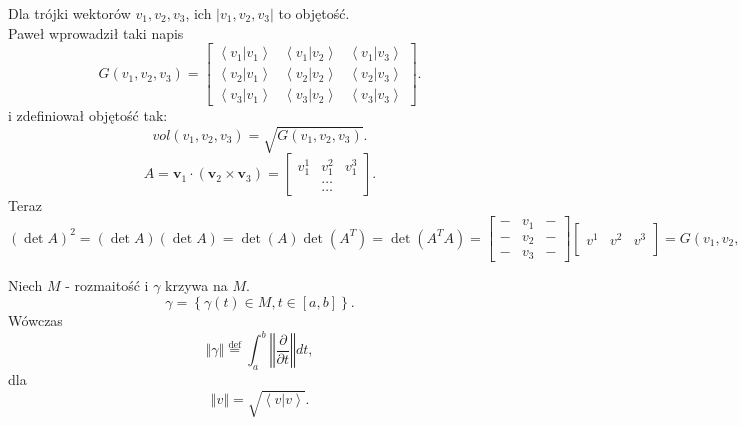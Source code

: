 \documentclass[../main.tex]{subfiles}
\begin{document}
    Dla trójki wektorów $v_1, v_2, v_3$, ich $\left| v_1, v_2, v_3 \right| $ to objętość.\\
    Paweł wprowadził taki napis
    \[
        G(v_1,v_2,v_3) = \begin{bmatrix} \left<v_1|v_1 \right>&\left<v_1|v_2 \right>&\left<v_1|v_3 \right>\\ \left<v_2|v_1 \right>&\left<v_2|v_2 \right>&\left<v_2|v_3 \right>\\ \left<v_3|v_1 \right>&\left<v_3|v_2 \right>&\left<v_3|v_3 \right> \end{bmatrix}
    .\]
i zdefiniował objętość tak:
 \[
     vol(v_1,v_2,v_3) = \sqrt{G(v_1,v_2,v_3)}
.\]
\[
    A = \mathbf{v}_1 \cdot (\mathbf{v}_2 \times \mathbf{v}_3) = \begin{bmatrix} v_1^1&v_1^2&v_1^3\\ &\ldots&\\ &\ldots &\end{bmatrix}
.\]
Teraz
\[
    \left( \det A \right)^2 = \left( \det A \right) \left( \det A \right) = \det(A)\det(A^T) = \det(A^TA) = \begin{bmatrix} -&v_1&-\\ -&v_2&-\\ -&v_3&- \end{bmatrix}\begin{bmatrix} &&\\ v^1&v^2&v^3\\ && \end{bmatrix} = G(v_1,v_2,v_3)
.\]
\begin{definicja}
    Niech $M$ - rozmaitość i $\gamma$ krzywa na $M$.
    \[
        \gamma = \left\{ \gamma(t)\in M, t\in[a,b] \right\}
    .\]
Wówczas
\[
\left\Vert \gamma \right\Vert \overset{\text{def}}{=} \int_a^b \left\Vert \frac{\partial }{\partial t}  \right\Vert dt
,\]
dla
\[
\left\Vert  v \right\Vert = \sqrt{\left<v|v \right>}
.\]
\end{definicja}
\end{document}

